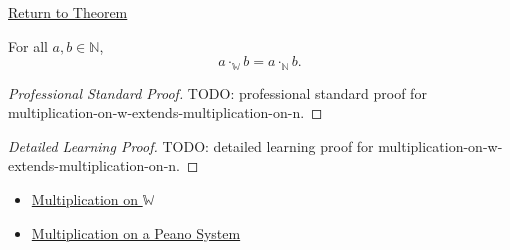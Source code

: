 \newpage
{}
\label{prf:multiplication-on-w-extends-multiplication-on-n}

\begin{remark*}[Return]
\hyperref[thm:multiplication-on-w-extends-multiplication-on-n]{Return to Theorem}
\end{remark*}

\begin{theorem*}
For all $a,b\in\mathbb{N}$,
\[
a\cdot_{\mathbb{W}}b=a\cdot_{\mathbb{N}}b.
\]
\end{theorem*}

\begin{proof}[Professional Standard Proof]
\LRAProofBodyStart
TODO: professional standard proof for multiplication-on-w-extends-multiplication-on-n.
\end{proof}

\begin{proof}[Detailed Learning Proof]
\LRAProofBodyStart
TODO: detailed learning proof for multiplication-on-w-extends-multiplication-on-n.
\end{proof}

\begin{remark*}
\end{remark*}

\begin{dependencies}
\begin{itemize}
  \item \hyperref[def:multiplication-on-w]{Multiplication on $\mathbb{W}$}
  \item \hyperref[def:multiplication-on-peano-system]{Multiplication on a Peano System}
\end{itemize}
\end{dependencies}

\clearpage
